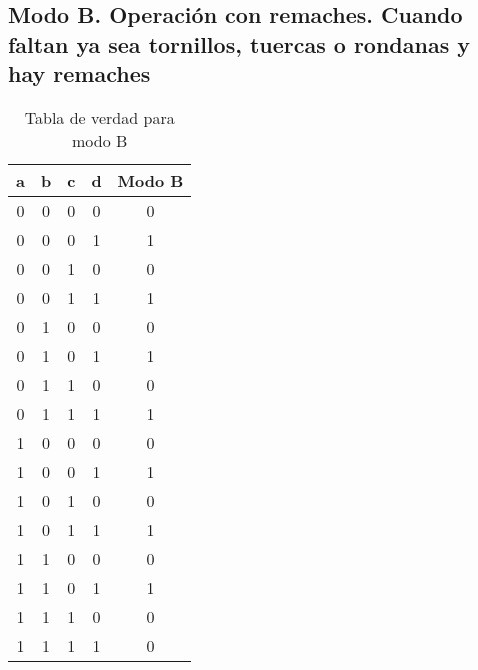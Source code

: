 \subsection{Modo B. Operación con remaches. Cuando faltan ya sea tornillos, tuercas o rondanas y hay remaches}
\begin{table}[!ht]
    \centering
    \begin{tabular}{|c|c|c|c|c|}
        \hline
        a & b & c & d & Modo B \\
        \hline
        0 & 0 & 0 & 0 & 0 \\
        \hline
        0 & 0 & 0 & 1 & 1 \\
        \hline
        0 & 0 & 1 & 0 & 0 \\
        \hline
        0 & 0 & 1 & 1 & 1 \\
        \hline
        0 & 1 & 0 & 0 & 0 \\
        \hline
        0 & 1 & 0 & 1 & 1 \\
        \hline
        0 & 1 & 1 & 0 & 0 \\
        \hline
        0 & 1 & 1 & 1 & 1 \\
        \hline
        1 & 0 & 0 & 0 & 0 \\
        \hline
        1 & 0 & 0 & 1 & 1 \\
        \hline
        1 & 0 & 1 & 0 & 0 \\
        \hline
        1 & 0 & 1 & 1 & 1 \\
        \hline
        1 & 1 & 0 & 0 & 0 \\
        \hline
        1 & 1 & 0 & 1 & 1 \\
        \hline
        1 & 1 & 1 & 0 & 0 \\
        \hline
        1 & 1 & 1 & 1 & 0 \\
        \hline        
    \end{tabular}
    \caption{Tabla de verdad para modo B}\label{table:modo-B}
\end{table}
\newpage
